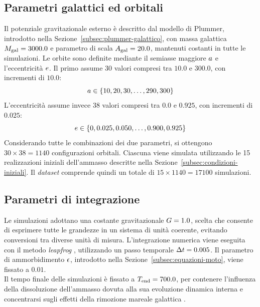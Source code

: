 \subsection{Parametri galattici ed orbitali}
\label{subsec:parametri-orbitali}
Il potenziale gravitazionale esterno è descritto dal modello di Plummer, introdotto nella Sezione~\ref{subsec:plummer-galattico}, con massa galattica $M_{\mathrm{gal}}=3000.0$ e parametro di scala $A_{\mathrm{gal}}=20.0$, mantenuti costanti in tutte le simulazioni.
Le orbite sono definite mediante il semiasse maggiore $a$ e l'eccentricità $e$. Il primo assume 30 valori compresi tra $10.0$ e $300.0$, con incrementi di $10.0$:
\[
a \in \{10,20,30,\ldots,290,300\}
\]
L'eccentricità assume invece 38 valori compresi tra $0.0$ e $0.925$, con incrementi di $0.025$:
\[
e\in\{0,0.025,0.050,\ldots,0.900,0.925\}
\]
Considerando tutte le combinazioni dei due parametri, si ottengono $30\times38=1140$ configurazioni orbitali. Ciascuna viene simulata utilizzando le 15 realizzazioni iniziali dell'ammasso descritte nella Sezione~\ref{subsec:condizioni-iniziali}. Il \emph{dataset} comprende quindi un totale di $15\times1140=17100$ simulazioni.
\subsection{Parametri di integrazione}
\label{subsec:parametri-integrazione}
Le simulazioni adottano una costante gravitazionale $G=1.0$, scelta che consente di esprimere tutte le grandezze in un sistema di unità coerente, evitando conversioni tra diverse unità di misura. L'integrazione numerica viene eseguita con il metodo \emph{leapfrog} \cite{hairer2006geometric}, utilizzando un passo temporale $\Delta t=0.005$. Il parametro di ammorbidimento $\epsilon$, introdotto nella Sezione~\ref{subsec:equazioni-moto}, viene fissato a $0.01$.\\
Il tempo finale delle simulazioni è fissato a $T_{\mathrm{end}}=700.0$, per contenere l'influenza della dissoluzione dell'ammasso dovuta alla sua evoluzione dinamica interna e concentrarsi sugli effetti della rimozione mareale galattica \cite{cai2016evolution}.

